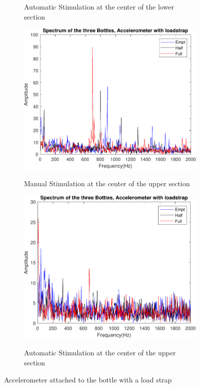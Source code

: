 \begin{figure}[]
\begin{subfigure}{0.45\textwidth}
        \caption{Automatic Stimulation at the center of the lower section}{}
        \label{subfig:ResAcCiAuBot}
    \end{subfigure}
    \begin{subfigure}{0.45\textwidth}
        \centering
        \includegraphics[width=\linewidth]{Chapters/6CHP/Figures/ResultsSensors/AcCiMaTop.pdf}
        \caption{Manual Stimulation at the center of the upper section}{}
        \label{subfig:ResAcCiMaTop}
    \end{subfigure}
    \begin{subfigure}{0.45\textwidth}
        \centering
        \includegraphics[width=\linewidth]{Chapters/6CHP/Figures/ResultsSensors/AcCiAuTop.pdf}
        \caption{Automatic Stimulation at the center of the upper section}{}
        \label{subfig:ResAcCiMaTop}
    \end{subfigure}
    \caption{Accelerometer attached to the bottle with a load strap}{}
    \label{fig:AccLoadStrap}
\end{figure}

